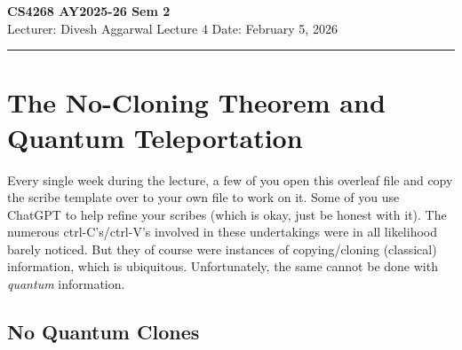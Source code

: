 \noindent
\textbf{CS4268 AY2025-26 Sem 2}
\\
\noindent
Lecturer: Divesh Aggarwal
\hfill
Lecture 4                      %
\hfill
Date: February 5, 2026          %


\noindent
\rule{\textwidth}{1pt}

\medskip

\section{The No-Cloning Theorem and Quantum Teleportation}
Every single week during the lecture, a few of you open this overleaf file and copy the scribe template over to your own file to work on it. Some of you use ChatGPT to help refine your scribes (which is okay, just be honest with it). The numerous ctrl-C's/ctrl-V's involved in these undertakings were in all likelihood barely noticed. But they of course were instances of copying/cloning (classical) information, which is ubiquitous. Unfortunately, the same cannot be done with \textit{quantum} information.

\subsection{No Quantum Clones}

